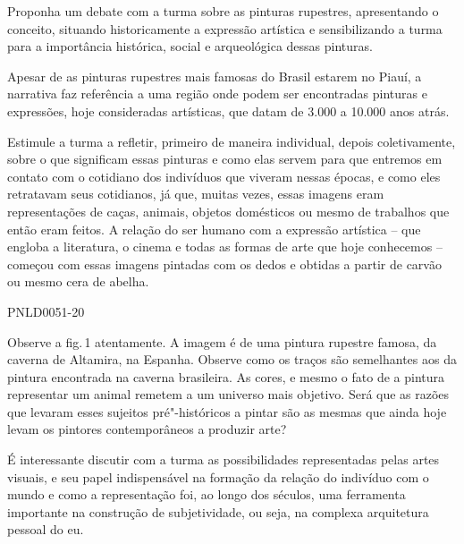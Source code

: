 \documentclass[12pt]{extarticle}
\begin{document}
Proponha um debate com a turma sobre as pinturas rupestres,
  apresentando o conceito, situando historicamente a expressão artística
  e sensibilizando a turma para a importância histórica, social e
  arqueológica dessas pinturas.

  Apesar de as pinturas rupestres mais famosas do Brasil estarem no
  Piauí, a narrativa faz referência a uma região onde podem ser
  encontradas pinturas e expressões, hoje consideradas artísticas, que
  datam de 3.000 a 10.000 anos atrás.

  Estimule a turma a refletir, primeiro de maneira individual, depois
  coletivamente, sobre o que significam essas pinturas e como elas
  servem para que entremos em contato com o cotidiano dos indivíduos que
  viveram nessas épocas, e como eles retratavam seus cotidianos, já que,
  muitas vezes, essas imagens eram representações de caças, animais,
  objetos domésticos ou mesmo de trabalhos que então eram feitos. A
  relação do ser humano com a expressão artística -- que engloba a
  literatura, o cinema e todas as formas de arte que hoje conhecemos --
  começou com essas imagens pintadas com os dedos e obtidas a partir de
  carvão ou mesmo cera de abelha.


%
{PNLD0051-20} 

Observe a fig.\,1 atentamente. 
  A imagem é de uma pintura rupestre famosa, da caverna de Altamira, na
  Espanha. Observe como os traços são semelhantes aos da pintura
  encontrada na caverna brasileira. As cores, e mesmo o fato de a
  pintura representar um animal remetem a um universo mais objetivo.
  Será que as razões que levaram esses sujeitos pré"-históricos a pintar
  são as mesmas que ainda hoje levam os pintores contemporâneos a
  produzir arte?

  É interessante discutir com a turma as possibilidades representadas
  pelas artes visuais, e seu papel indispensável na formação da relação
  do indivíduo com o mundo e como a representação foi, ao longo dos
  séculos, uma ferramenta importante na construção de subjetividade, ou
  seja, na complexa arquitetura pessoal do eu.
\end{document}
